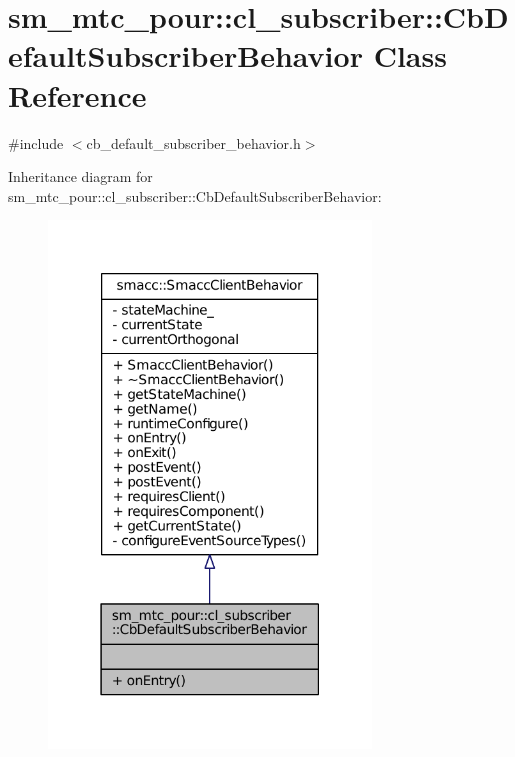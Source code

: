 \hypertarget{classsm__mtc__pour_1_1cl__subscriber_1_1CbDefaultSubscriberBehavior}{}\section{sm\+\_\+mtc\+\_\+pour\+:\+:cl\+\_\+subscriber\+:\+:Cb\+Default\+Subscriber\+Behavior Class Reference}
\label{classsm__mtc__pour_1_1cl__subscriber_1_1CbDefaultSubscriberBehavior}


{\ttfamily \#include $<$cb\+\_\+default\+\_\+subscriber\+\_\+behavior.\+h$>$}



Inheritance diagram for sm\+\_\+mtc\+\_\+pour\+:\+:cl\+\_\+subscriber\+:\+:Cb\+Default\+Subscriber\+Behavior\+:
\nopagebreak
\begin{figure}[H]
\begin{center}
\leavevmode
\includegraphics[width=243pt]{classsm__mtc__pour_1_1cl__subscriber_1_1CbDefaultSubscriberBehavior__inherit__graph}
\end{center}
\end{figure}


